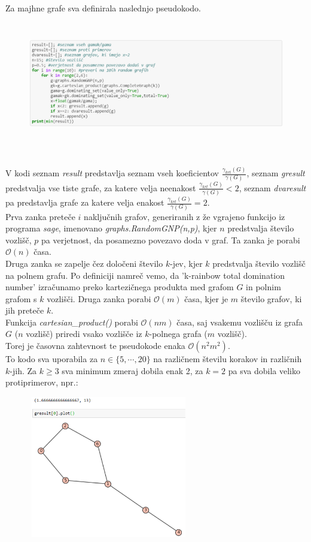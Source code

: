 \documentclass[a4paper]{article}
\begin{document}
Za majhne grafe sva definirala naslednjo pseudokodo.
\begin{figure}[h!]
    \centering
    \includegraphics[width=13cm, height=5.35cm]{Slika1}
    \label{fig:mesh1}
\end{figure}\\
V kodi seznam \textit{result} predstavlja seznam vseh koeficientov $\frac{\gamma_{krt}(G)}{\gamma(G)}$, seznam \textit{gresult} predstvalja vse tiste grafe, za katere velja neenakost $\frac{\gamma_{krt}(G)}{\gamma(G)} < 2$, seznam \textit{dvaresult} pa predstavlja grafe za katere velja enakost $\frac{\gamma_{krt}(G)}{\gamma(G)} = 2$.\\
Prva zanka preteče $i$ naključnih grafov, generiranih z že vgrajeno funkcijo iz programa \textit{sage}, imenovano \textit{graphs.RandomGNP(n,p)}, kjer $n$ predstvalja število vozlišč, $p$ pa verjetnost, da posamezno povezavo doda v graf. Ta zanka je porabi $\mathcal{O}(n)$ časa.\\
Druga zanka se zapelje čez določeni število $k$-jev, kjer $k$ predstvalja število vozlišč na polnem grafu. Po definiciji namreč  vemo, da 'k-rainbow total domination number' izračunamo preko kartezičnega produkta med grafom $G$ in polnim grafom s $k$ vozlišči. Druga zanka porabi $\mathcal{O}(m)$ časa, kjer je $m$ število grafov, ki jih preteče $k$.\\
Funkcija \textit{cartesian\_product()} porabi $\mathcal{O}(n m)$ časa, saj vsakemu vozlišču iz grafa $G$ ($n$ vozlišč) priredi vsako vozlišče iz $k$-polnega grafa ($m$ vozlišč).\\
Torej je časovna zahtevnost te pseudokode enaka $\mathcal{O}(n^2 m^2)$.\\[1.5mm]
To kodo sva uporabila za $n \in \{5, \cdots, 20\}$ na različnem številu korakov in različnih $k$-jih. Za $k \geq 3$ sva minimum zmeraj dobila enak 2, za $k = 2$ pa sva dobila veliko protiprimerov, npr.:
\pagebreak
\begin{figure}[h!]
    \centering
    \includegraphics[width=7cm, height=6.2cm]{Slika2}
    \label{fig:mesh1}
\end{figure}\\
\end{document}

